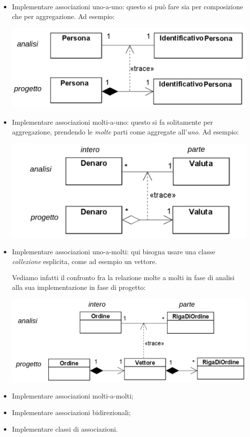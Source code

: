 \documentclass[a4paper,11pt]{article}
\begin{document}
\begin{itemize}
	\item Implementare associazioni uno-a-uno: questo si può fare sia per composizione che per aggregazione.
		Ad esempio:
\begin{center}
	\includegraphics[scale=0.3]{../figures/uno-uno.png}
\end{center}

	\item Implementare associazioni molti-a-uno: questo si fa solitamente per aggregazione, prendendo le \textit{molte} parti come aggregate all'\textit{uno}.
		Ad esempio:
\begin{center}
	\includegraphics[scale=0.3]{../figures/molti-uno.png}
\end{center}

	\item Implementare associazioni uno-a-molti: qui bisogna usare una classe \textit{collezione} esplicita, come ad esempio un vettore.
		
		Vediamo infatti il confronto fra la relazione molte a molti in fase di analisi alla sua implementazione in fase di progetto:
\begin{center}
	\includegraphics[scale=0.3]{../figures/uno-molti.png}
\end{center}


	\item Implementare associazioni molti-a-molti;
	\item Implementare associazioni bidirezionali;
	\item Implementare classi di associazioni.
\end{itemize}
\end{document}
